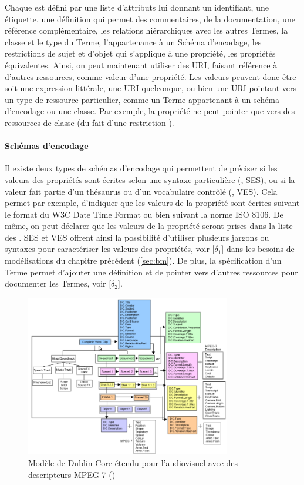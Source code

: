 Chaque  est défini par une liste d'attributs lui donnant un identifiant, une étiquette, une définition qui permet des commentaires, de la documentation, une référence complémentaire, les relations hiérarchiques avec les autres Termes, la classe et le type du Terme, l'appartenance à un Schéma d'encodage, les restrictions de sujet et d'objet qui s'applique à une propriété, les propriétés équivalentes.
Ainsi, on peut maintenant utiliser des URI, faisant référence à d'autres ressources, comme valeur d'une propriété.
Les valeurs peuvent donc être soit une expression littérale, une URI quelconque, ou bien une URI pointant vers un type de ressource particulier, comme un Terme appartenant à un schéma d'encodage ou une classe.
Par exemple, la propriété  ne peut pointer que vers des ressources de classe  (du fait d'une restriction ). 


\paragraph{Schémas d'encodage}
Il existe deux types de schémas d'encodage qui permettent de préciser si les valeurs des propriétés sont écrites selon une syntaxe particulière (, SES), ou si la valeur fait partie d'un thésaurus ou d'un vocabulaire contrôlé (, VES).
Cela permet par exemple, d'indiquer que les valeurs de la propriété  sont écrites suivant le format du W3C Date Time Format ou bien suivant la norme ISO 8106. 
De même, on peut déclarer que les valeurs de la propriété  seront prises dans la liste des . 
SES et VES offrent ainsi la possibilité d'utiliser plusieurs jargons ou syntaxes pour caractériser les valeurs des propriétés, voir [$\delta_1$] dans les besoins de modélisations du chapitre précédent (\ref{sec:bm}).
De plus, la spécification d'un Terme permet d'ajouter une définition et de pointer vers d'autres ressources pour documenter les Termes, voir [$\delta_2$].

\begin{figure}[ht!]
\centering
\includegraphics[width=0.8\textwidth]{images/HunterDCMI-MPEG7.png}
\caption{Modèle de Dublin Core étendu pour l'audiovisuel avec des descripteurs MPEG-7 (\cite{Hunter1999})}
\label{img:dcmi-mpeg7}
\end{figure}


